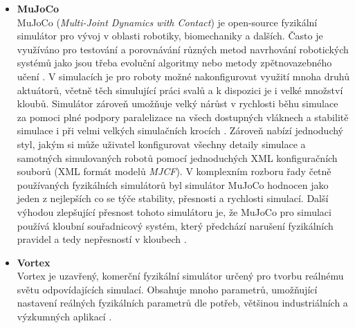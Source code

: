 \begin{itemize}
    \item \textbf{MuJoCo}\\ \label{MuJoCo}
        MuJoCo (\emph{Multi-Joint Dynamics with Contact}) je open-source
        fyzikální simulátor pro vývoj v oblasti robotiky, biomechaniky a
        dalších. Často je využíváno pro testování a porovnávání různých metod
        navrhování robotických systémů jako jsou třeba evoluční algoritmy nebo
        metody zpětnovazebného učení \citep{salimans2017evolution}. V
        simulacích je pro roboty možné nakonfigurovat využití mnoha druhů
        aktuátorů, včetně těch simulující práci svalů a k dispozici je i velké
        množství kloubů. Simulátor zároveň umožňuje velký nárůst v rychlosti
        běhu simulace za pomoci plné podpory paralelizace na všech dostupných
        vláknech a stabilitě simulace i při velmi velkých simulačních krocích
        \citep{todorov2014mujoco}. Zároveň nabízí jednoduchý styl, jakým si
        může uživatel konfigurovat všechny detaily simulace a samotných
        simulovaných robotů pomocí jednoduchých XML konfiguračních souborů (XML
        formát modelů \emph{MJCF}). V komplexním rozboru řady četně používaných
        fyzikálních simulátorů byl simulátor MuJoCo hodnocen jako jeden z
        nejlepších co se týče stability, přesnosti a rychlosti simulací. Další
        výhodou zlepšující přesnost tohoto simulátoru je, že MuJoCo pro
        simulaci používá kloubní souřadnicový systém, který předchází narušení
        fyzikálních pravidel a tedy nepřesností v kloubech
        \citep{erez2015simulation}.

    \item \textbf{Vortex}\\ \label{Vortex}
        Vortex je uzavřený, komerční fyzikální simulátor určený pro tvorbu
        reálnému světu odpovídajících simulací. Obsahuje mnoho parametrů,
        umožňující nastavení reálných fyzikálních parametrů dle potřeb,
        většinou industriálních a výzkumných aplikací \citep{coppeliarobotics}
        \citep{yoon2023comparative}.

\end{itemize}
